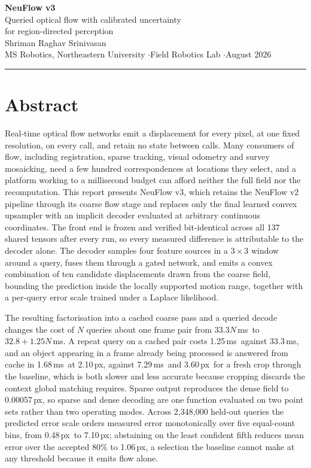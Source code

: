 \documentclass[11pt,a4paper]{article}
\newcommand{\px}{\,px}
\newcommand{\ms}{\,ms}
\begin{document}
\begin{center}
{\LARGE\bfseries NeuFlow v3}\\[4pt]
{\large Queried optical flow with calibrated uncertainty\\for region-directed perception}\\[10pt]
{\normalsize Shriman Raghav Srinivasan}\\[2pt]
{\footnotesize\color{muted} MS Robotics, Northeastern University \quad$\cdot$\quad Field Robotics Lab \quad$\cdot$\quad August 2026}
\end{center}
\vspace{2pt}
{\color{rule}\hrule}
\vspace{8pt}

\section*{Abstract}
Real-time optical flow networks emit a displacement for every pixel, at one fixed
resolution, on every call, and retain no state between calls. Many consumers of
flow, including registration, sparse tracking, visual odometry and survey
mosaicking, need a few hundred correspondences at locations they select, and a
platform working to a millisecond budget can afford neither the full field nor
the recomputation. This report presents NeuFlow v3, which retains the NeuFlow v2
pipeline through its coarse flow stage and replaces only the final learned convex
upsampler with an implicit decoder evaluated at arbitrary continuous coordinates.
The front end is frozen and verified bit-identical across all 137 shared tensors
after every run, so every measured difference is attributable to the decoder
alone. The decoder samples four feature sources in a $3\times3$ window around a
query, fuses them through a gated network, and emits a convex combination of ten
candidate displacements drawn from the coarse field, bounding the prediction
inside the locally supported motion range, together with a per-query error scale
trained under a Laplace likelihood.

The resulting factorisation into a cached coarse pass and a queried decode changes
the cost of $N$ queries about one frame pair from $33.3N$\ms\ to $32.8 + 1.25N$\ms.
A repeat query on a cached pair costs 1.25\ms\ against 33.3\ms, and an object
appearing in a frame already being processed is answered from cache in 1.68\ms\ at
2.10\px, against 7.29\ms\ and 3.60\px\ for a fresh crop through the baseline, which
is both slower and less accurate because cropping discards the context global
matching requires. Sparse output reproduces the dense field to 0.00057\px, so
sparse and dense decoding are one function evaluated on two point sets rather than
two operating modes. Across 2{,}348{,}000 held-out queries the predicted error
scale orders measured error monotonically over five equal-count bins, from
0.48\px\ to 7.10\px; abstaining on the least confident fifth reduces mean error
over the accepted 80\% to 1.06\px, a selection the baseline cannot make at any
threshold because it emits flow alone.
\end{document}
